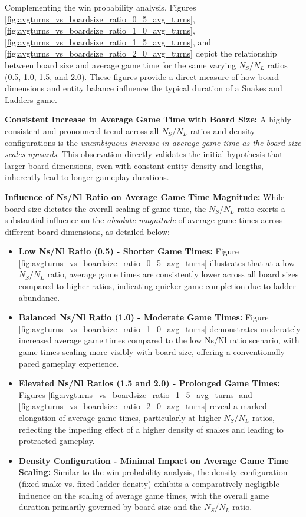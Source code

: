 Complementing the win probability analysis, Figures \ref{fig:avgturns_vs_boardsize_ratio_0_5_avg_turns}, \ref{fig:avgturns_vs_boardsize_ratio_1_0_avg_turns}, \ref{fig:avgturns_vs_boardsize_ratio_1_5_avg_turns}, and \ref{fig:avgturns_vs_boardsize_ratio_2_0_avg_turns} depict the relationship between board size and average game time for the same varying $N_S/N_L$ ratios (0.5, 1.0, 1.5, and 2.0).  These figures provide a direct measure of how board dimensions and entity balance influence the typical duration of a Snakes and Ladders game.

\textbf{Consistent Increase in Average Game Time with Board Size:}  A highly consistent and pronounced trend across all $N_S/N_L$ ratios and density configurations is the \textit{unambiguous increase in average game time as the board size scales upwards}. This observation directly validates the initial hypothesis that larger board dimensions, even with constant entity density and lengths, inherently lead to longer gameplay durations. 

\textbf{Influence of Ns/Nl Ratio on Average Game Time Magnitude:} While board size dictates the overall scaling of game time, the $N_S/N_L$ ratio exerts a substantial influence on the \textit{absolute magnitude} of average game times across different board dimensions, as detailed below:

\begin{itemize}
	\item \textbf{Low Ns/Nl Ratio (0.5) - Shorter Game Times:} Figure \ref{fig:avgturns_vs_boardsize_ratio_0_5_avg_turns} illustrates that at a low $N_S/N_L$ ratio, average game times are consistently lower across all board sizes compared to higher ratios, indicating quicker game completion due to ladder abundance.
	
	\item \textbf{Balanced Ns/Nl Ratio (1.0) - Moderate Game Times:} Figure \ref{fig:avgturns_vs_boardsize_ratio_1_0_avg_turns} demonstrates moderately increased average game times compared to the low Ns/Nl ratio scenario, with game times scaling more visibly with board size, offering a conventionally paced gameplay experience.
	
	\item \textbf{Elevated Ns/Nl Ratios (1.5 and 2.0) - Prolonged Game Times:} Figures \ref{fig:avgturns_vs_boardsize_ratio_1_5_avg_turns} and \ref{fig:avgturns_vs_boardsize_ratio_2_0_avg_turns} reveal a marked elongation of average game times, particularly at higher $N_S/N_L$ ratios, reflecting the impeding effect of a higher density of snakes and leading to protracted gameplay.
	
	\item \textbf{Density Configuration - Minimal Impact on Average Game Time Scaling:}  Similar to the win probability analysis, the density configuration (fixed snake vs. fixed ladder density) exhibits a comparatively negligible influence on the scaling of average game times, with the overall game duration primarily governed by board size and the $N_S/N_L$ ratio.
\end{itemize}

